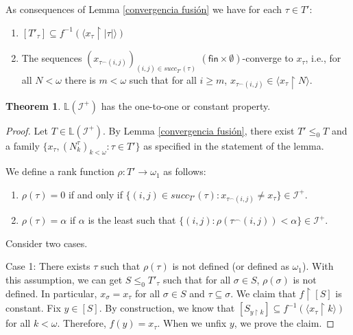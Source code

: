 \documentclass{amsart}
\theoremstyle{definition}
\newtheorem{theorem}{Theorem}[section]
\theoremstyle{remark}
\numberwithin{equation}{section}
\newcommand{\fin}{\mathsf{fin}}
\newcommand{\li}{\mathbb{L}(\mathcal{I}^+)}
\newcommand{\id}{\mathcal{I}}
\newcommand{\restr}[2]{#1\upharpoonright {#2}}
\begin{document}
As consequences of Lemma \ref{convergencia fusión} we have for each $\tau\in T'$:
\begin{enumerate}
    \item $[T'_\tau]\subseteq f^{-1}(\langle \restr{x_\tau}{|\tau|} \rangle)$
    \item The sequences $(x_{\tau^\frown(i,j)})_{(i,j)\in succ_{T'}(\tau)}$ $(\fin\times \emptyset)$-converge to $x_\tau$, i.e., for all $N<\omega$ there is $m<\omega$ such that for all $i\geq m$, $x_{\tau^\frown(i,j)}\in \langle \restr{x_\tau}{N} \rangle$.
\end{enumerate}


\begin{theorem}
    $\li$ has the one-to-one or constant property. 
\end{theorem}

\begin{proof}
    Let $T\in \mathbb{L}(\mathcal{I}^+)$. By Lemma \ref{convergencia fusión}, there exist $T'\leq_0 T$ and a family $\{x_\tau, (N_k^\tau)_{k<\omega} : \tau \in T'\}$ as specified in the statement of the lemma.

    We define a rank function $\rho:T'\rightarrow\omega_1$ as follows:
    \begin{enumerate}
        \item $\rho(\tau)=0$ if and only if $\{(i,j)\in succ_{T'}(\tau):x_{\tau^\frown(i,j)}\not =x_\tau\}\in\id^+$.
        \item $\rho(\tau)=\alpha$ if $\alpha$ is the least such that $\{(i,j):\rho(\tau^\frown(i,j))<\alpha\}\in\id^+$.
    \end{enumerate}

    Consider two cases.
    
    Case 1: There exists $\tau$ such that $\rho(\tau)$ is not defined (or defined as $\omega_1$). With this assumption, we can get $S\leq_0 T'_\tau$ such that for all $\sigma \in S$, $\rho(\sigma)$ is not defined. In particular, $x_\sigma=x_\tau$  for all $\sigma \in S$ and $\tau\subseteq \sigma$. We claim that $\restr{f}{[S]}$ is constant. Fix $y\in [S]$. By construction,  we know that  $[S_{\restr{y}{k}}]\subseteq f^{-1}(\langle \restr{x_\tau}{k} \rangle)$ for all $k<\omega$. Therefore, $f(y)=x_\tau.$ When we unfix $y$, we prove the claim.


\end{proof}
\end{document}
